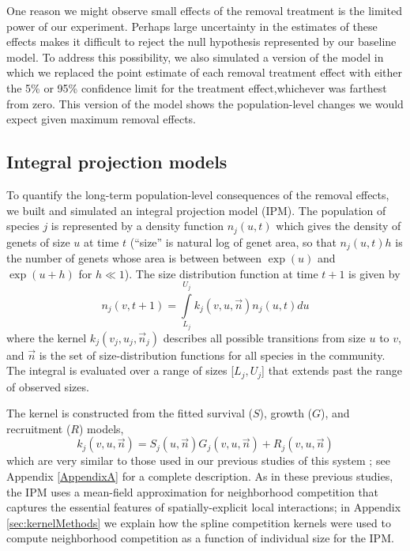 \documentclass[11pt]{article}
\begin{document}
\begin{doublespacing}
One reason we might observe small effects of the removal treatment is the limited power of our experiment. Perhaps large uncertainty in the estimates of these effects makes it difficult to reject the null hypothesis represented by our baseline model. To address this possibility, we also simulated a version of the model in which we replaced the point estimate of each removal treatment effect with either the 5\% or 95\% confidence limit for the treatment effect,whichever was farthest from zero. This version of the model shows the population-level changes we would expect given maximum removal effects.

\subsection*{Integral projection models}

To quantify the long-term population-level consequences of the removal effects, we built and simulated an integral projection model (IPM). The population 
of species $j$ is represented by a density function $n_j(u,t)$ which gives the density of genets of size $u$ at time $t$ (``size'' is natural log of genet area, so 
that $n_j(u,t)h$ is the number of genets whose area is between between $\exp(u)$ and $\exp(u+h)$ for $h \ll 1$). The size distribution function at time $t+1$ is given by
\begin{equation}
n_j(v,t+1)=\int\limits_{L_j}^{U_j} k_j (v,u,{\vec{n}})n_j(u,t)du   
\label{eqn:IPM}
\end{equation}
where the kernel $k_j (v_j,u_j,\vec{n}_j)$ describes all possible transitions from size $u$ to $v$, and $\vec{n}$ 
is the set of size-distribution functions for all species in the community. The integral is evaluated over a range of sizes [$L_j,U_j$] 
that extends past the range of observed sizes.  

The kernel is constructed from the fitted survival ($S$), growth ($G$), and recruitment ($R$) models, 
\begin{equation}
k_j(v,u,\vec{n})=S_j(u,\vec{n})G_j(v,u,\vec{n})+R_j(v,u,\vec{n}) 
\label{eqn:IPM} 
\end{equation}
which are very similar to those used in our previous studies of this system \citep{adler_coexistence_2010,adler_forecasting_2012}; see 
Appendix \ref{AppendixA} for a complete description. As in these previous studies, the IPM uses a mean-field approximation for
neighborhood competition that captures the essential features of spatially-explicit local interactions; 
in Appendix \ref{sec:kernelMethods} we explain how the spline competition kernels were used 
to compute neighborhood competition as a function of individual size for the IPM.  


\end{doublespacing}
\end{document}
